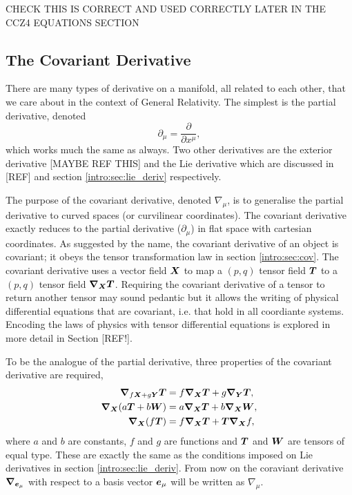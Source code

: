 CHECK THIS IS CORRECT AND USED CORRECTLY LATER IN THE CCZ4 EQUATIONS SECTION




\subsection{The Covariant Derivative}\label{intro:sec:covariant_derivative}

There are many types of derivative on a manifold, all related to each other, that we care about in the context of General Relativity. The simplest is the partial derivative, denoted \begin{equation}\partial_\mu = \frac{\partial}{\partial x^\mu},\end{equation} which works much the same as always. Two other derivatives are the exterior derivative [MAYBE REF THIS] and the Lie derivative which are discussed in [REF] and section \ref{intro:sec:lie_deriv} respectively. 

The purpose of the covariant derivative, denoted $\nabla_\mu$, is to generalise the partial derivative to curved spaces (or curvilinear coordinates). The covariant derivative exactly reduces to the partial derivative ($\partial_\mu$) in flat space with cartesian coordinates. As suggested by the name, the covariant derivative of an object is covariant; it obeys the tensor transformation law in section \ref{intro:sec:cov}. The covariant derivative uses a vector field $\boldsymbol{X}$ to map a $(p,q)$ tensor field $\boldsymbol{T}$ to 
 a $(p,q)$ tensor field ${\boldsymbol{\nabla}_{\boldsymbol{X}}} \boldsymbol{T}$. Requiring the covariant derivative of a tensor to return another tensor may sound pedantic but it allows the writing of physical differential equations that are covariant, i.e. that hold in all coordiante systems. Encoding the laws of physics with tensor differential equations is explored in more detail in Section [REF!]. 

To be the analogue of the partial derivative, three properties of the covariant derivative are required,
\begin{align}
\label{intro:eq:cov-lin}\boldsymbol{\nabla}_{f\boldsymbol{X} + g\boldsymbol{Y}}\boldsymbol{T} &= f\boldsymbol{\nabla}_{\boldsymbol{X}}\boldsymbol{T} + g\boldsymbol{\nabla}_{\boldsymbol{Y}}\boldsymbol{T} , \\
\label{intro:eq:cov-ass}\boldsymbol{\nabla}_{\boldsymbol{X}}( a\boldsymbol{T} + b\boldsymbol{W}) &= a\boldsymbol{\nabla}_{\boldsymbol{X}}\boldsymbol{T} + b\boldsymbol{\nabla}_{\boldsymbol{X}}\boldsymbol{W} , \\
\label{intro:eq:cov-pro}\boldsymbol{\nabla}_{\boldsymbol{X}}( f\boldsymbol{T}) &= f\boldsymbol{\nabla}_{\boldsymbol{X}}\boldsymbol{T} + \boldsymbol{T} \boldsymbol{\nabla}_{\boldsymbol{X}}f , 
\end{align}
where $a$ and $b$ are constants, $f$ and $g$ are functions and $\boldsymbol{T}$ and $\boldsymbol{W}$ are tensors of equal type. These are exactly the same as the conditions imposed on Lie derivatives in section \ref{intro:sec:lie_deriv}. From now on the coraviant derivative $\boldsymbol{\nabla}_{\boldsymbol{e}_\mu}$ with respect to a basis vector $\boldsymbol{e}_\mu$ will be written as $\nabla_\mu$.

